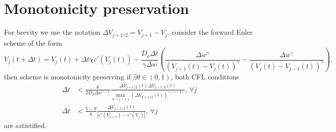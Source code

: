 \documentclass{article}
\begin{document}
  \section{Monotonicity preservation}
  For brevity we use the notation $\Delta V_{j + 1 / 2} = V_{j + 1} - V_j$,
  consider the forward Euler scheme of the form
  \begin{equation}
    \label{eq:Euler scheme}
    V_j(t + \Delta t) = V_j(t)
    + \Delta t\chi c'(V_j(t))
    - \frac{D_\rho\Delta t}{\gamma\Delta w}\left(\frac{\Delta w^\gamma}{(V_{j + 1}(t) - V_j(t))^\gamma}
      - \frac{\Delta w^\gamma}{(V_j(t) - V_{j - 1}(t))^\gamma}\right),
  \end{equation}
  then scheme is monotonicity preserving if $\exists\theta \in (0, 1)$, both CFL conditions
  \begin{subequations}
    \begin{align}
      \label{eq:CFL diffusion}
      \Delta t &< \frac{\theta}{2D_\rho \Delta w^{\gamma - 1}}
        \frac{\Delta V_{j + 1 / 2}(t)\Delta V_{j - 1 / 2}(t)}
          {\max_{k = j - 1, j}\left(\Delta V_{k + 1 / 2}(t)\right)^{-(\gamma - 1)}},
      \,\forall j \\
      \label{eq:CFL chemo}
      \Delta t &< \frac{1 - \theta}{\chi}\frac{\Delta V_{j + 1 / 2}(t)}{\left|c'(V_{j + 1}) - c'(V_j)\right|},
      \,\forall j
    \end{align}
  \end{subequations}
  are satistified.
\end{document}
